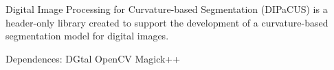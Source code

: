 Digital Image Processing for Curvature-\/based Segmentation (D\+I\+Pa\+C\+US) is a header-\/only library created to support the development of a curvature-\/based segmentation model for digital images.

Dependences\+: D\+Gtal Open\+CV Magick++ 